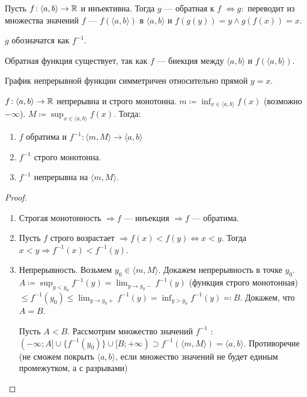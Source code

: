 \begin{definition}
    Пусть $f\!: \langle a, b \rangle \to \mathbb{R}$ и инъективна. Тогда  $g$ --- обратная к  $f$  $\iff g\!:$ переводит из множества значений $f$ --- $f(\langle a, b\rangle)$ в $\langle a, b \rangle$ и $f(g(y)) = y \land g(f(x)) = x$.

    $g$ обозначатся как  $f^{-1}$.
\end{definition}
\begin{remark}
    Обратная функция существует, так как $f$ --- биекция между  $\langle a, b \rangle$ и  $f(\langle a, b \rangle)$.
\end{remark}
\begin{remark}
    График непрерывной функции симметричен относительно прямой $y=x$.
\end{remark}
\begin{theorem}
    $f\!: \langle a, b\rangle \to \mathbb{R}$ непрерывна и строго монотонна. $m \coloneqq \inf_{x \in \langle a, b \rangle} f(x)$ (возможно $-\infty$). $M \coloneqq \sup_{x \in \langle a, b \rangle} f(x)$. Тогда:
    \begin{enumerate}
        \item $f$ обратима и  $f^{-1}\!: \langle m, M \rangle \to \langle a, b \rangle$
        \item  $f^{-1}$ строго монотонна.
        \item  $f^{-1}$ непрерывна на  $\langle m, M \rangle$.
    \end{enumerate}
\end{theorem}
\begin{proof}
    \slashn
    \begin{enumerate}
        \item Строгая монотонность $\Rightarrow f$ --- инъекция  $\Rightarrow f$ --- обратима.
        \item  Пусть  $f$ строго возрастает  $\Rightarrow f(x) < f(y) \iff x < y$.  Тогда $x < y \Rightarrow f^{-1}(x) < f^{-1}(y)$.
        \item Непрерывность. Возьмем  $y_0 \in \langle m, M \rangle$. Докажем непрерывность в точке $y_0$.  $A \coloneqq \sup_{y < y_0} f^{-1}(y) = \lim_{y \to y_0-} f^{-1}(y)$ (функция строго монотонная) $\le f^{-1}(y_0) \le \lim_{y \to y_0+} f^{-1}(y) = \inf_{y > y_0} f^{-1}(y) \eqqcolon B$. Докажем, что $A = B$.

		Пусть $A < B$. Рассмотрим множество значений  $f^{-1}$ : $(-\infty; A] \cup \{f^{-1}(y_0)\} \cup [B; +\infty) \supset f^{-1}(\langle m, M \rangle) = \langle a, b \rangle$. Противоречие (не сможем покрыть $\langle a, b \rangle$, если множество значений не будет единым промежутком, а с разрывами)
    \end{enumerate}
\end{proof}

